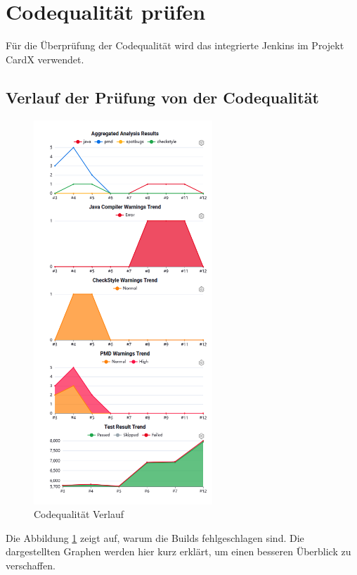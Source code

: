 \section{Codequalität prüfen}
Für die Überprüfung der Codequalität wird das integrierte Jenkins im Projekt CardX verwendet.

\subsection{Verlauf der Prüfung von der Codequalität}

\begin{figure}[H]
	\begin{center}
		\includegraphics[width=0.6\textwidth]{ressourcen/Build-verlauf}
		\caption[Codequalität Verlauf]{Codequalität Verlauf}\label{ch:build-verlauf}
	\end{center}
\end{figure}

Die Abbildung \ref{ch:build-verlauf} zeigt auf, warum die Builds fehlgeschlagen sind. Die dargestellten Graphen werden hier kurz erklärt, um einen besseren Überblick zu verschaffen.

